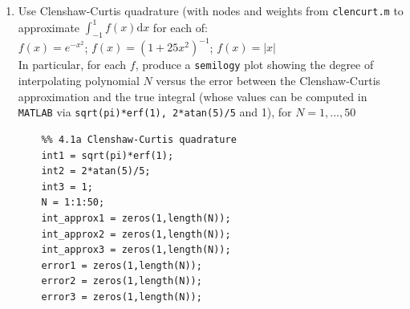 \documentclass[14pt,a4paper]{article}
\begin{document}
\begin{enumerate}
	\label{1a}
	\item Use Clenshaw-Curtis quadrature (with nodes and weights from \texttt{clencurt.m} to approximate $\int_{-1}^{1}f(x)\mathrm{d}x$ for each of: \\
	\hspace*{2cm} $ f(x) = e^{-x^2}$; \hspace{1.5cm} $f(x) = (1+25x^2)^{-1}$; \hspace{1.5cm} $ f(x) = |x|$ \\
	In particular, for each $f$, produce a \texttt{semilogy} plot showing the degree of interpolating polynomial $N$ versus the error between the Clenshaw-Curtis approximation and the true integral (whose values can be computed in \texttt{MATLAB} via \texttt{sqrt(pi)*erf(1), 2*atan(5)/5} and 1), for $N = 1, ..., 50$ 
	\begin{lstlisting}
	%% 4.1a Clenshaw-Curtis quadrature
	int1 = sqrt(pi)*erf(1);
	int2 = 2*atan(5)/5;
	int3 = 1;
	N = 1:1:50;
	int_approx1 = zeros(1,length(N));
	int_approx2 = zeros(1,length(N));
	int_approx3 = zeros(1,length(N));
	error1 = zeros(1,length(N));
	error2 = zeros(1,length(N));
	error3 = zeros(1,length(N));
	

\end{lstlisting}
\end{enumerate}
\end{document}
